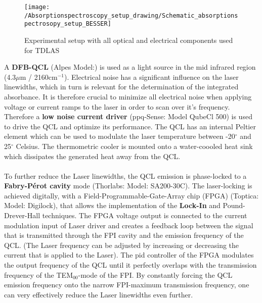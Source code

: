 \begin{figure}[H]
	\centering
	\texttt{[image: /Absorptionspectroscopy\_setup\_drawing/Schematic\_absorptionspectrosopy\_setup\_BESSER]}
	\caption{Experimental setup with all optical and electrical components used for TDLAS}
	\label{fig:experimental_setup_sketch}
\end{figure}
\noindent
A \textbf{DFB-QCL} (Alpes Model:) is used as a light source in the mid infrared region (4.3$\mu$m / 2160cm$^{-1}$). Electrical noise has a significant influence on the laser linewidths, which in turn is relevant for the determination of the integrated absorbance. It is therefore crucial to minimize all electrical noise when applying voltage or current ramps to the laser in order to scan over it's frequency. Therefore a \textbf{low noise current driver} (ppq-Sense: Model QubeCl 500) is used to drive the QCL and optimize its performance. The QCL has an internal Peltier element which can be used to modulate the laser temperature between -20$^{\circ}$ and 25$^{\circ}$ Celsius. The thermometric cooler is mounted onto a water-coooled heat sink which dissipates the generated heat away from the QCL. \\\\
\noindent
To further reduce the Laser linewidths, the QCL emission is phase-locked to a \textbf{Fabry-Pérot cavity} mode (Thorlabs: Model: 	
SA200-30C). The laser-locking is achieved digitally, with a Field-Programmable-Gate-Array chip (FPGA) (Toptica: Model: Digilock), that allows the implementation of the \textbf{Lock-In} and Pound-Drever-Hall techniques. The FPGA voltage output is connected to the current modulation input of Laser driver and creates a feedback loop between the signal that is transmitted through the FPI cavity and the emission frequency of the QCL. (The Laser frequency can be adjusted by increasing or decreasing the current that is applied to the Laser). The pid controller of the FPGA modulates the output frequency of the QCL until it  perfectly overlaps with the transmission frequency of the TEM$_{00}$-mode of the FPI. By constantly forcing the QCL emission frequency onto the narrow FPI-maximum transmission frequency, one can very effectively reduce the Laser linewidths even further.\\\\
\noindent
